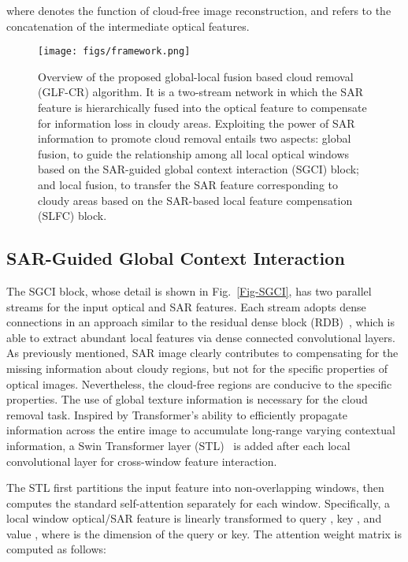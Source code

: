 \documentclass[a4paper,fleqn]{cas-dc}
\begin{document}
where  denotes the function of cloud-free image reconstruction, and  refers to the concatenation of the intermediate optical features. 

\begin{figure*}[!t]
	\centering
	\texttt{[image: figs/framework.png]}
	\caption{Overview of the proposed global-local fusion based cloud removal (GLF-CR) algorithm. It is a two-stream network in which the SAR feature is hierarchically fused into the optical feature to compensate for information loss in cloudy areas. Exploiting the power of SAR information to promote cloud removal entails two aspects: global fusion, to guide the relationship among all local optical windows based on the SAR-guided global context interaction (SGCI) block; and local fusion, to transfer the SAR feature corresponding to cloudy areas based on the SAR-based local feature compensation (SLFC) block. }
	\label{overview}
	\vspace{-5mm}
\end{figure*}



\subsection{SAR-Guided Global Context Interaction}
\label{Sec-SGCI}
The SGCI block, whose detail is shown in Fig.~\ref{Fig-SGCI}, has two parallel streams for the input optical and SAR features. Each stream adopts dense connections in an approach similar to the residual dense block (RDB)~\citep{zhang2018residual}, which is able to extract abundant local features via dense connected convolutional layers. As previously mentioned, SAR image clearly contributes to compensating for the missing information about cloudy regions, but not for the specific properties of optical images. Nevertheless, the cloud-free regions are conducive to the specific properties. The use of global texture information is necessary for the cloud removal task. Inspired by Transformer's ability to efficiently propagate information across the entire image to accumulate long-range varying contextual information, 
a Swin Transformer layer (STL)~\citep{liu2021swin} is added after each local convolutional layer for cross-window feature interaction.

The STL first partitions the input feature into non-overlapping windows, then computes the standard self-attention separately for each window. Specifically, a local window optical/SAR feature  is linearly transformed to query , key , and value , where  is the dimension of the query or key. The attention weight matrix is computed as follows: 
\end{document}
